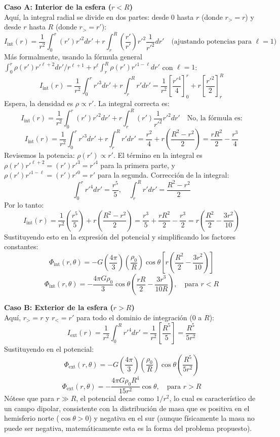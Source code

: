 \documentclass[a4paper]{article}
\begin{document}
\textbf{Caso A: Interior de la esfera ($r < R$)} \\
Aquí, la integral radial se divide en dos partes: desde $0$ hasta $r$ (donde $r_{>} = r$) y desde $r$ hasta $R$ (donde $r_{>} = r'$):
$$
I_{\text{int}}(r) = \frac{1}{r^2} \int_0^r \left( r' \right) r'^2 dr' + r \int_r^R \left( \frac{r'}{r'} \right) r'^2 \frac{1}{r'^2} dr' \quad \text{(ajustando potencias para } \ell=1)
$$
Más formalmente, usando la fórmula general $\int_0^r \rho(r') r'^{\ell+2} dr' / r^{\ell+1} + r^\ell \int_r^R \rho(r') r'^{1-\ell} dr'$ con $\ell=1$:
$$
I_{\text{int}}(r) = \frac{1}{r^2} \int_0^r r'^3 dr' + r \int_r^R r' dr' = \frac{1}{r^2} \left[ \frac{r'^4}{4} \right]_0^r + r \left[ \frac{r'^2}{2} \right]_r^R
$$
Espera, la densidad es $\rho \propto r'$. La integral correcta es:
$$
I_{\text{int}}(r) = \frac{1}{r^2} \int_0^r (r') r'^2 dr' + r \int_r^R (r') \frac{1}{r'^2} r'^2 dr' \quad \text{No, la fórmula es:}
$$
$$
I_{\text{int}}(r) = \frac{1}{r^2} \int_0^r r'^3 dr' + r \int_r^R r' dr' = \frac{r^2}{4} + r \left( \frac{R^2 - r^2}{2} \right) = \frac{r R^2}{2} - \frac{r^3}{4}
$$
Revisemos la potencia: $\rho(r') \propto r'$. El término en la integral es $\rho(r') r'^{\ell+2} = (r') r'^{3} = r'^4$ para la primera parte, y $\rho(r') r'^{1-\ell} = (r') r'^{0} = r'$ para la segunda.
Corrección de la integral:
$$
\int_0^r r'^4 dr' = \frac{r^5}{5}, \quad \int_r^R r' dr' = \frac{R^2 - r^2}{2}
$$
Por lo tanto:
$$
I_{\text{int}}(r) = \frac{1}{r^2} \left( \frac{r^5}{5} \right) + r \left( \frac{R^2 - r^2}{2} \right) = \frac{r^3}{5} + \frac{r R^2}{2} - \frac{r^3}{2} = r \left( \frac{R^2}{2} - \frac{3r^2}{10} \right)
$$
Sustituyendo esto en la expresión del potencial y simplificando los factores constantes:
$$
\Phi_{\text{int}}(r, \theta) = -G \left( \frac{4\pi}{3} \right) \left( \frac{\rho_0}{R} \right) \cos\theta \left[ r \left( \frac{R^2}{2} - \frac{3r^2}{10} \right) \right]
$$
$$
\Phi_{\text{int}}(r, \theta) = -\frac{4\pi G \rho_0}{3} \cos\theta \left( \frac{r R}{2} - \frac{3r^3}{10R} \right), \quad \text{para } r < R
$$

\textbf{Caso B: Exterior de la esfera ($r > R$)} \\
Aquí, $r_{>} = r$ y $r_{<} = r'$ para todo el dominio de integración ($0$ a $R$):
$$
I_{\text{ext}}(r) = \frac{1}{r^2} \int_0^R r'^4 dr' = \frac{1}{r^2} \left[ \frac{R^5}{5} \right] = \frac{R^5}{5r^2}
$$
Sustituyendo en el potencial:
$$
\Phi_{\text{ext}}(r, \theta) = -G \left( \frac{4\pi}{3} \right) \left( \frac{\rho_0}{R} \right) \cos\theta \left( \frac{R^5}{5r^2} \right)
$$
$$
\Phi_{\text{ext}}(r, \theta) = -\frac{4\pi G \rho_0 R^4}{15 r^2} \cos\theta, \quad \text{para } r > R
$$
Nótese que para $r \gg R$, el potencial decae como $1/r^2$, lo cual es característico de un campo dipolar, consistente con la distribución de masa que es positiva en el hemisferio norte ($\cos\theta > 0$) y negativa en el sur (aunque físicamente la masa no puede ser negativa, matemáticamente esta es la forma del problema propuesto).
\end{document}
